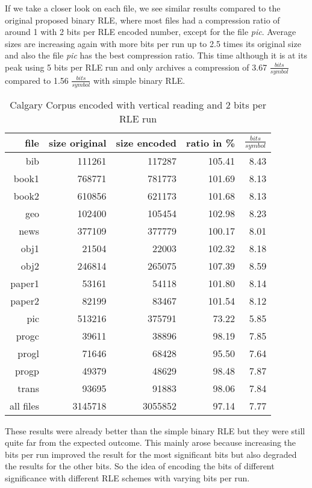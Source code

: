 \par{
If we take a closer look on each file, we see similar results compared to the original proposed binary RLE, where most files had a compression ratio of around 1 with 2 bits per RLE encoded number, except for the file \textit{pic}. Average sizes are increasing again with more bits per run up to 2.5 times its original size and also the file \textit{pic} has the best compression ratio. This time although it is at its peak using 5 bits per RLE run and only archives a compression of 3.67 $\frac{bits}{symbol}$ compared to 1.56 $\frac{bits}{symbol}$ with simple binary RLE.

\begin{table}[H]
	\centering
	\begin{tabular}{r|r|r|r|r}	
		file & size original & size encoded & ratio in \% & $\frac{bits}{symbol}$\\
		\hline
		bib & 111261 & 117287 & 105.41 & 8.43\\
		book1 & 768771 & 781773 & 101.69 & 8.13 \\
		book2 & 610856 & 621173 & 101.68 & 8.13\\
		geo & 102400 & 105454 & 102.98 & 8.23\\
		news & 377109 & 377779 & 100.17 & 8.01\\
		obj1 & 21504 & 22003 & 102.32 & 8.18\\
		obj2& 246814 & 265075 & 107.39 & 8.59\\		 
		paper1 & 53161 & 54118 & 101.80 & 8.14\\		 
		paper2& 82199 & 83467 & 101.54 & 8.12\\		 
		pic & 513216 & 375791 & 73.22 & 5.85\\		 
		progc & 39611 & 38896 & 98.19 & 7.85\\		 
		progl & 71646 & 68428 & 95.50 & 7.64\\		 
		progp & 49379 & 48629 & 98.48 & 7.87\\		 
		trans & 93695 & 91883 & 98.06 & 7.84\\
		\hline
		all files & 3145718 & 3055852 & 97.14 & 7.77
	\end{tabular}
	\caption{Calgary Corpus encoded with vertical reading and 2 bits per RLE run}
	\label{tab:t41 Calgary Corpus encoded with vertical reading and 2 bits per RLE run}
\end{table}	
}
\par{
These results were already better than the simple binary RLE but they were still quite far from the expected outcome. This mainly arose because increasing the bits per run improved the result for the most significant bits but also degraded the results for the other bits. So the idea of encoding the bits of different significance with different RLE schemes with varying bits per run.  
}

